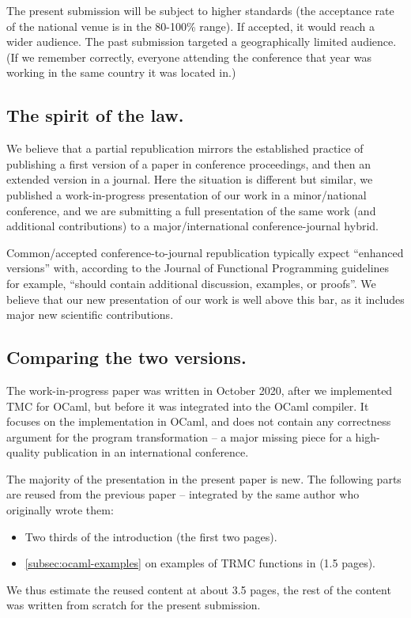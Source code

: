 The present submission will be subject to higher standards
(the acceptance rate of the national venue is in the
80-100\% range). If accepted, it would reach a wider audience. The
past submission targeted a geographically limited audience. (If we
remember correctly, everyone attending the conference that year was
working in the same country it was located in.)

\subsection{The spirit of the law.}

We believe that a partial republication mirrors the established
practice of publishing a first version of a paper in conference
proceedings, and then an extended version in a journal. Here the
situation is different but similar, we published a work-in-progress
presentation of our work in a minor/national conference, and we are
submitting a full presentation of the same work
(and additional contributions) to a major/international
conference-journal hybrid.

Common/accepted conference-to-journal republication typically expect
``enhanced versions'' with, according to the Journal of Functional
Programming guidelines for example, ``should contain additional
discussion, examples, or proofs''. We believe that our new
presentation of our work is well above this bar, as it includes major
new scientific contributions.

\subsection{Comparing the two versions.}

The work-in-progress paper was written in October 2020, after we
implemented TMC for OCaml, but before it was integrated into the OCaml
compiler. It focuses on the implementation in OCaml, and does not
contain any correctness argument for the program transformation --
a major missing piece for a high-quality publication in an
international conference.

The majority of the presentation in the present paper is new. The
following parts are reused from the previous paper --
integrated by the same author who originally wrote them:
\begin{itemize}
\item Two thirds of the introduction (the first two pages).
\item \cref{subsec:ocaml-examples} on examples of TRMC functions in
  \OCaml (1.5 pages).
\end{itemize}
We thus estimate the reused content at about 3.5 pages, the rest of
the content was written from scratch for the present submission.

